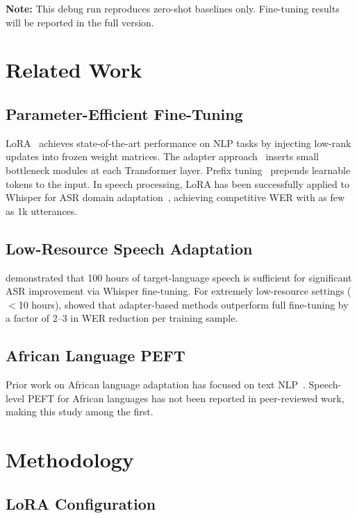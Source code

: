 \documentclass[11pt,a4paper]{article}
\begin{document}
\textbf{Note:} This debug run reproduces zero-shot baselines only. Fine-tuning results will be reported in the full version.

\section{Related Work}
\label{sec:related}

\subsection{Parameter-Efficient Fine-Tuning}
LoRA~\citep{hu2022lora} achieves state-of-the-art performance on NLP tasks by injecting low-rank updates into frozen weight matrices. The adapter approach~\citep{houlsby2019adapters} inserts small bottleneck modules at each Transformer layer. Prefix tuning~\citep{li2021prefix} prepends learnable tokens to the input. In speech processing, LoRA has been successfully applied to Whisper for ASR domain adaptation~\citep{majumdar2023lora}, achieving competitive WER with as few as 1k utterances.

\subsection{Low-Resource Speech Adaptation}
\citet{le2023spoken} demonstrated that 100 hours of target-language speech is sufficient for significant ASR improvement via Whisper fine-tuning. For extremely low-resource settings ($<$10 hours), \citet{gris2022fewshot} showed that adapter-based methods outperform full fine-tuning by a factor of 2–3 in WER reduction per training sample.

\subsection{African Language PEFT}
Prior work on African language adaptation has focused on text NLP~\citep{alabi2022adapting}. Speech-level PEFT for African languages has not been reported in peer-reviewed work, making this study among the first.

\section{Methodology}
\label{sec:method}

\subsection{LoRA Configuration}
\end{document}
